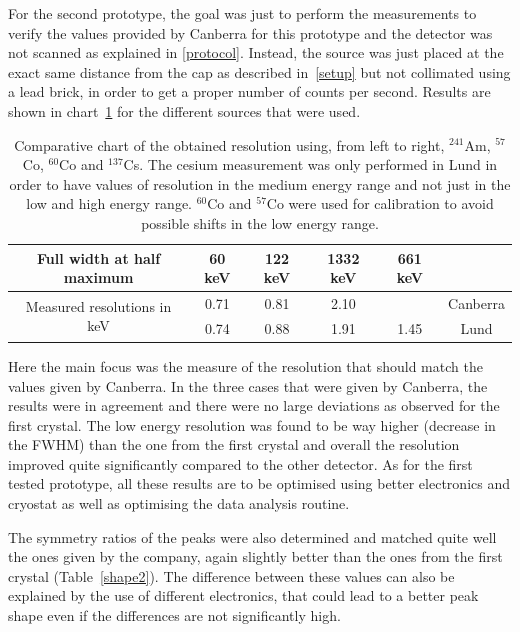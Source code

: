 \documentclass[11pt,a4paper]{article}
\begin{document}
For the second prototype, the goal was just to perform the measurements to verify the values provided by Canberra for this prototype and the detector was not scanned as explained in \ref{protocol}. Instead, the source was just placed at the exact same distance from the cap as described in~\ref{setup} but not collimated using a lead brick, in order to get a proper number of counts per second. Results are shown in chart~\ref{recap2} for the different sources that were used.

\begin{table}[]
\centering
\caption{Comparative chart of the obtained resolution using, from left to right, $^{241}$Am, $^{57}$Co, $^{60}$Co and $^{137}$Cs. The cesium measurement was only performed in Lund in order to have values of resolution in the medium energy range and not just in the low and high energy range. $^{60}$Co and $^{57}$Co were used for calibration to avoid possible shifts in the low energy range.}
\label{recap2}
\begin{tabular}{|c|c|c|c|c|c}
\cline{1-5}
Full width at half maximum                   & 60 keV & 122 keV & 1332 keV & 661 keV &                               \\ \hline
\multirow{2}{*}{Measured resolutions in keV} & 0.71   & 0.81    & 2.10     &         & \multicolumn{1}{c|}{Canberra} \\ \cline{2-6} 
                                             & 0.74   & 0.88    & 1.91     & 1.45    & \multicolumn{1}{c|}{Lund}     \\ \hline
\end{tabular}
\end{table}

Here the main focus was the measure of the resolution that should match the values given by Canberra. In the three cases that were given by Canberra, the results were in agreement and there were no large deviations as observed for the first crystal. The low energy resolution was found to be way higher (decrease in the FWHM) than the one from the first crystal and overall the resolution improved quite significantly compared to the other detector. As for the first tested prototype, all these results are to be optimised using better electronics and cryostat as well as optimising the data analysis routine.

The symmetry ratios of the peaks were also determined and matched quite well the ones given by the company, again slightly better than the ones from the first crystal (Table~\ref{shape2}). The difference between these values can also be explained by the use of different electronics, that could lead to a better peak shape even if the differences are not significantly high.
\end{document}
